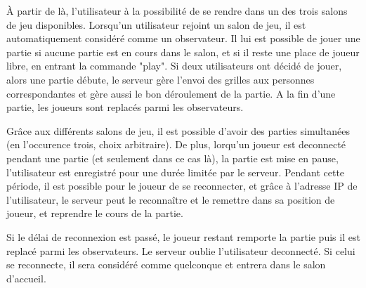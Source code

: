 \documentclass[a4paper]{article}
\begin{document}
À partir de là, l'utilisateur à la possibilité de se rendre dans un des trois salons de jeu disponibles. Lorsqu'un utilisateur rejoint un salon de jeu, il est automatiquement considéré comme un observateur. Il lui est possible de jouer une partie si aucune partie est en cours dans le salon, et si il reste une place de joueur libre, en entrant la commande "play". Si deux utilisateurs ont décidé de jouer, alors une partie débute, le serveur gère l'envoi des grilles aux personnes correspondantes et gère aussi le bon déroulement de la partie. A la fin d'une partie, les joueurs sont replacés parmi les observateurs.


Grâce aux différents salons de jeu, il est possible d'avoir des parties simultanées (en l'occurence trois, choix arbitraire). De plus, lorqu'un joueur est deconnecté pendant une partie (et seulement dans ce cas là), la partie est mise en pause, l'utilisateur est enregistré pour une durée limitée par le serveur. Pendant cette période, il est possible pour le joueur de se reconnecter, et grâce à l'adresse IP de l'utilisateur, le serveur peut le reconnaître et le remettre dans sa position de joueur, et reprendre le cours de la partie.


Si le délai de reconnexion est passé, le joueur restant remporte la partie puis il est replacé parmi les observateurs. Le serveur oublie l'utilisateur deconnecté. Si celui se reconnecte, il sera considéré comme quelconque et entrera dans le salon d'accueil.
\end{document}
